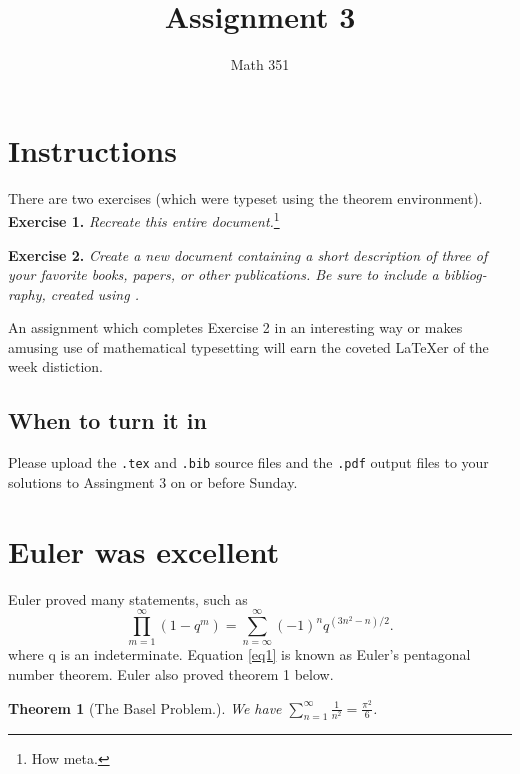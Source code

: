\documentclass{article}
\title{Assignment 3}
\author{Math 351}
\date{}
\newtheorem{theorem}{Theorem}
\begin{document}
\maketitle

\tableofcontents
\section{Instructions}

There are two exercises (which were typeset using the theorem environment).
\noindent\textbf{Exercise 1.} \emph{Recreate this entire document.}\footnote{How meta.}

\noindent\textbf{Exercise 2.} \emph{Create a new document containing a short description
of three of your favorite books, papers, or other publications. Be sure to include
a bibliog-raphy, created using .}

An assignment which completes Exercise 2 in an interesting way or makes amusing
use of mathematical typesetting will earn the coveted \LaTeX er of the week distiction.

\subsection[Due Date]{When to turn it in}

Please upload the \verb~.tex~ and \verb~.bib~ source files and the \verb~.pdf~ output files
to your solutions to Assingment 3 on or before Sunday.

\section{Euler was excellent}

Euler proved many statements, such as
\begin{equation}
    \prod_{m=1}^{\infty} \left(1-q^m\right) = \sum_{n=\infty}^{\infty} \left(-1\right)^n q^{\left(3n^2-n\right)/2}. \label{eq1}
\end{equation}
where q is an indeterminate. Equation \eqref{eq1} is known as Euler's pentagonal number
theorem. Euler also proved theorem 1 below.

\begin{theorem}[The Basel Problem.]
We have $\sum\limits_{n=1}^{\infty} \frac{1}{n^2} = \frac{\pi^2}{6}$.
\end{theorem}
\end{document}
